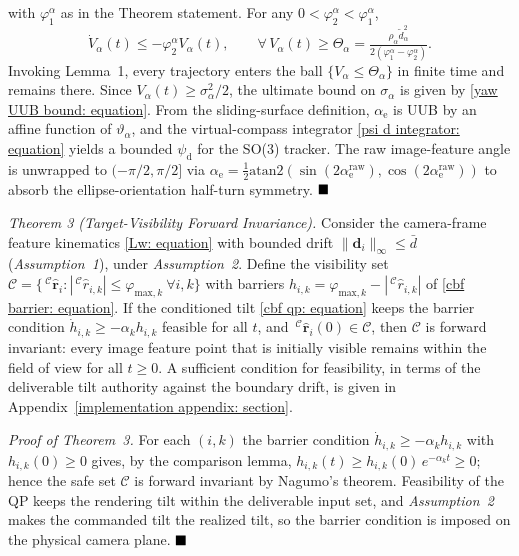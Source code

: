 \documentclass{IEEEtaes}
\begin{document}
with $\varphi_1^\alpha$ as in the Theorem statement. For any $0<\varphi_2^\alpha<\varphi_1^\alpha$,
\begin{equation*}
\dot{V}_\alpha(t)\le -\varphi_2^\alpha V_\alpha(t),\qquad \forall\,V_\alpha(t)\ge\Theta_\alpha = \tfrac{\rho_\alpha\tilde{d}_\alpha^2}{2(\varphi_1^\alpha-\varphi_2^\alpha)}.
\end{equation*}
Invoking Lemma~1, every trajectory enters the ball $\{V_\alpha\le\Theta_\alpha\}$ in finite time and remains there. Since $V_\alpha(t)\ge\sigma_\alpha^2/2$, the ultimate bound on $\sigma_\alpha$ is given by \eqref{yaw UUB bound: equation}. From the sliding-surface definition, $\alpha_\text{e}$ is UUB by an affine function of $\vartheta_\alpha$, and the virtual-compass integrator \eqref{psi d integrator: equation} yields a bounded $\psi_\text{d}$ for the SO(3) tracker. The raw image-feature angle is unwrapped to $(-\pi/2,\pi/2]$ via $\alpha_\text{e} = \tfrac12\text{atan2}(\sin(2\alpha_\text{e}^\text{raw}),\cos(2\alpha_\text{e}^\text{raw}))$ to absorb the ellipse-orientation half-turn symmetry. $\hfill\blacksquare$

\textit{Theorem 3 (Target-Visibility Forward Invariance).}
Consider the camera-frame feature kinematics \eqref{Lw: equation} with bounded drift $\|\boldsymbol{d}_i\|_\infty\le\bar{d}$ (\textit{Assumption~1}), under \textit{Assumption~2}. Define the visibility set $\mathcal{C}=\{\,^\mathcal{C}\hat{\boldsymbol{r}}_i:|\,^\mathcal{C}\hat{r}_{i,k}|\le\varphi_{\text{max},k}\ \forall i,k\}$ with barriers $h_{i,k}=\varphi_{\text{max},k}-|\,^\mathcal{C}\hat{r}_{i,k}|$ of \eqref{cbf barrier: equation}. If the conditioned tilt \eqref{cbf qp: equation} keeps the barrier condition $\dot{h}_{i,k}\ge-\alpha_k h_{i,k}$ feasible for all $t$, and $\,^\mathcal{C}\hat{\boldsymbol{r}}_i(0)\in\mathcal{C}$, then $\mathcal{C}$ is forward invariant: every image feature point that is initially visible remains within the field of view for all $t\ge 0$. A sufficient condition for feasibility, in terms of the deliverable tilt authority against the boundary drift, is given in Appendix~\ref{implementation appendix: section}.

\textit{Proof of Theorem~3.} For each $(i,k)$ the barrier condition $\dot{h}_{i,k}\ge-\alpha_k h_{i,k}$ with $h_{i,k}(0)\ge 0$ gives, by the comparison lemma, $h_{i,k}(t)\ge h_{i,k}(0)\,e^{-\alpha_k t}\ge 0$; hence the safe set $\mathcal{C}$ is forward invariant by Nagumo's theorem. Feasibility of the QP keeps the rendering tilt within the deliverable input set, and \textit{Assumption~2} makes the commanded tilt the realized tilt, so the barrier condition is imposed on the physical camera plane. $\hfill\blacksquare$
\end{document}
